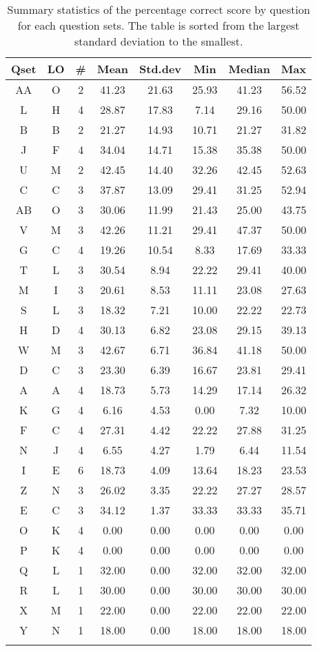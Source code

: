 \documentclass[12pt,english,nohyper]{tufte-handout}\usepackage[]{graphicx}\usepackage[]{color}
\begin{document}
\begin{longtable}{cc|ccc|ccc}
  \hline
Qset & LO & \# & Mean & Std.dev & Min & Median & Max \\ 
  \hline
AA & O &   2 & 41.23 & 21.63 & 25.93 & 41.23 & 56.52 \\ 
  L & H &   4 & 28.87 & 17.83 & 7.14 & 29.16 & 50.00 \\ 
  B & B &   2 & 21.27 & 14.93 & 10.71 & 21.27 & 31.82 \\ 
  J & F &   4 & 34.04 & 14.71 & 15.38 & 35.38 & 50.00 \\ 
  U & M &   2 & 42.45 & 14.40 & 32.26 & 42.45 & 52.63 \\ 
  C & C &   3 & 37.87 & 13.09 & 29.41 & 31.25 & 52.94 \\ 
  AB & O &   3 & 30.06 & 11.99 & 21.43 & 25.00 & 43.75 \\ 
  V & M &   3 & 42.26 & 11.21 & 29.41 & 47.37 & 50.00 \\ 
  G & C &   4 & 19.26 & 10.54 & 8.33 & 17.69 & 33.33 \\ 
  T & L &   3 & 30.54 & 8.94 & 22.22 & 29.41 & 40.00 \\ 
  M & I &   3 & 20.61 & 8.53 & 11.11 & 23.08 & 27.63 \\ 
  S & L &   3 & 18.32 & 7.21 & 10.00 & 22.22 & 22.73 \\ 
  H & D &   4 & 30.13 & 6.82 & 23.08 & 29.15 & 39.13 \\ 
  W & M &   3 & 42.67 & 6.71 & 36.84 & 41.18 & 50.00 \\ 
  D & C &   3 & 23.30 & 6.39 & 16.67 & 23.81 & 29.41 \\ 
  A & A &   4 & 18.73 & 5.73 & 14.29 & 17.14 & 26.32 \\ 
  K & G &   4 & 6.16 & 4.53 & 0.00 & 7.32 & 10.00 \\ 
  F & C &   4 & 27.31 & 4.42 & 22.22 & 27.88 & 31.25 \\ 
  N & J &   4 & 6.55 & 4.27 & 1.79 & 6.44 & 11.54 \\ 
  I & E &   6 & 18.73 & 4.09 & 13.64 & 18.23 & 23.53 \\ 
  Z & N &   3 & 26.02 & 3.35 & 22.22 & 27.27 & 28.57 \\ 
  E & C &   3 & 34.12 & 1.37 & 33.33 & 33.33 & 35.71 \\ 
  O & K &   4 & 0.00 & 0.00 & 0.00 & 0.00 & 0.00 \\ 
  P & K &   4 & 0.00 & 0.00 & 0.00 & 0.00 & 0.00 \\ 
  Q & L &   1 & 32.00 & 0.00 & 32.00 & 32.00 & 32.00 \\ 
  R & L &   1 & 30.00 & 0.00 & 30.00 & 30.00 & 30.00 \\ 
  X & M &   1 & 22.00 & 0.00 & 22.00 & 22.00 & 22.00 \\ 
  Y & N &   1 & 18.00 & 0.00 & 18.00 & 18.00 & 18.00 \\ 
   \hline
\hline
\caption{Summary statistics of the percentage correct score by question for each question sets. The table is sorted from the largest standard deviation to the smallest.} 
\label{tab:QuestionSet_summary}
\end{longtable}
\end{document}
